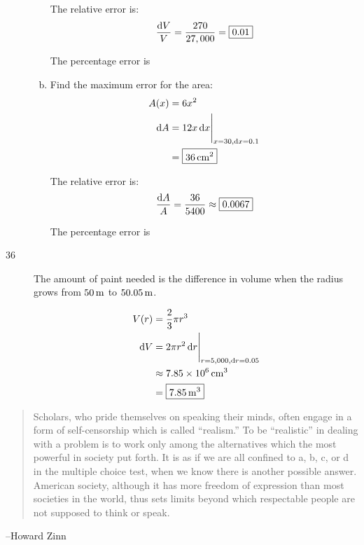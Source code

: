 \documentclass[letterpaper]{exam}
\newcommand{\dx}{\dif x}
\begin{document}
\begin{description}
\begin{enumerate}[(a)]
          The relative error is:
          \[
            \frac{\dif V}{V} = \frac{270}{27,000} = \boxed{ 0.01 } \\
          \]

          The percentage error is 

        \item 
          Find the maximum error for the area:
          \begin{align*}
            A(x)   & = 6x^2 \\
            \dif A & = \eval{ 12x \dx }_{x = 30, \dx = 0.1} \\
                   & = \boxed{ \unit[36]{cm^2} } \\
          \end{align*}

          The relative error is:
          \[
            \frac{\dif A}{A} = \frac{36}{5400} \approx \boxed{ 0.0067 } \\
          \]

          The percentage error is 

      \end{enumerate}

    \newpage

    \item[36]
      The amount of paint needed is the difference in volume when the radius grows from 
      $\unit[50]{m}$ to $\unit[50.05]{m}$.

      \begin{align*}
        V(r)   & = \frac{2}{3} \pi r^3 \\
        \dif V & = \eval{ 2 \pi r^2 \dif r }_{r = 5,000, \dif r = 0.05 } \\
               & \approx \unit[7.85 \times 10^6]{cm^3} \\
               & = \boxed{ \unit[7.85]{m^3} } \\
      \end{align*}

  \end{description}

  \else
    \vspace{9 cm}
    \begin{quote}
      \begin{em}
        Scholars, who pride themselves on speaking their minds, often engage in a form of
        self-censorship which is called ``realism.'' To be ``realistic'' in dealing with a problem
        is to work only among the alternatives which the most powerful in society put forth. It is
        as if we are all confined to a, b, c, or d in the multiple choice test, when we know there
        is another possible answer. American society, although it has more freedom of expression
        than most societies in the world, thus sets limits beyond which respectable people are not
        supposed to think or speak.
      \end{em}
    \end{quote}
    \hspace{2 cm} --Howard Zinn
  \fi
\end{document}

